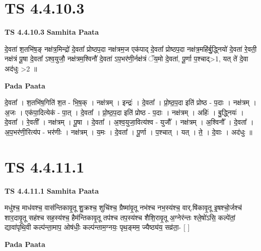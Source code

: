 \documentclass[17pt]{extarticle}
\begin{document}
\section*{ TS 4.4.10.3 }

\textbf{TS 4.4.10.3 } \newline
\textbf{Samhita Paata} \newline

दे॒वता॑ श॒तभि॑ष॒ङ् नक्ष॑त्र॒मिन्द्रो॑ दे॒वता᳚ प्रोष्ठप॒दा नक्ष॑त्रम॒ज एक॑पाद् दे॒वता᳚ प्रोष्ठप॒दा नक्ष॑त्र॒महि॑र्बु॒द्ध्नियो॑ दे॒वता॑ रे॒वती॒ नक्ष॑त्रं पू॒षा दे॒वता᳚ ऽश्व॒युजौ॒ नक्ष॑त्रम॒श्विनौ॑ दे॒वता॑ ऽप॒भर॑णी॒र्नक्ष॑त्रं ॅय॒मो दे॒वता॑, पू॒र्णा प॒श्चाद्>1, यत् ते॑ दे॒वा अद॑धुः >2 ॥ \newline

\textbf{Pada Paata} \newline

दे॒वता᳚ । श॒तभि॑ष॒गिति॑ श॒त - भि॒ष॒क् । नक्ष॑त्रम् । इन्द्रः॑ । दे॒वता᳚ । प्रो॒ष्ठ॒प॒दा इति॑ प्रोष्ठ - प॒दाः । नक्ष॑त्रम् । अ॒जः । एक॑पा॒दित्येक॑ - पा॒त् । दे॒वता᳚ । प्रो॒ष्ठ॒प॒दा इति॑ प्रोष्ठ - प॒दाः । नक्ष॑त्रम् । अहिः॑ । बु॒द्ध्नियः॑ । दे॒वता᳚ । रे॒वती᳚ । नक्ष॑त्रम् । पू॒षा । दे॒वता᳚ । अ॒श्व॒युजा॒वित्य॑श्व - युजौ᳚ । नक्ष॑त्रम् । अ॒श्विनौ᳚ । दे॒वता᳚ । अ॒प॒भर॑णी॒रित्य॑प - भर॑णीः । नक्ष॑त्रम् । य॒मः । दे॒वता᳚ । पू॒र्णा । प॒श्चात् । यत् । ते॒ । दे॒वाः । अद॑धुः ॥  \newline




\section*{ TS 4.4.11.1 }

\textbf{TS 4.4.11.1 } \newline
\textbf{Samhita Paata} \newline

मधु॑श्च॒ माध॑वश्च॒ वास॑न्तिकावृ॒तू शु॒क्रश्च॒ शुचि॑श्च॒ ग्रैष्मा॑वृ॒तू नभ॑श्च नभ॒स्य॑श्च॒ वार्.षि॑कावृ॒तू इ॒षश्चो॒र्जश्च॑ शार॒दावृ॒तू सह॑श्च सह॒स्य॑श्च॒ हैम॑न्तिकावृ॒तू तप॑श्च तप॒स्य॑श्च शैशि॒रावृ॒तू अ॒ग्नेर॑न्तः श्ले॒षो॑ऽसि॒ कल्पे॑तां॒ द्यावा॑पृथि॒वी कल्प॑न्ता॒माप॒ ओष॑धीः॒ कल्प॑न्ताम॒ग्नयः॒ पृथ॒ङ्मम॒ ज्यैष्ठ्य॑य॒ सव्र॑ता॒- [  ] \newline

\textbf{Pada Paata} \newline
\end{document}
